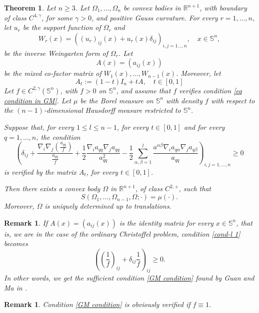 \documentclass[12pt]{amsart}
\newtheorem{thm}{Theorem}[section]
\newtheorem{remark}[theorem]{Remark}
\newcommand{\R}{\mathbb R}
\newcommand{\1}{\mathbf 1}
\newcommand{\s}{\mathbb S}
\newcommand{\sfe}{{{\mathbb S}^{n}}}
\begin{document}
\begin{thm}\label{Thm MCP} Let $n\ge3$. Let $\Omega_1,\dots,\Omega_n$ be convex bodies in $\R^{n+1}$, with boundary of class $C^{4,\gamma}$, for some $\gamma>0$, and positive Gauss curvature. For every $r=1,\dots,n$, let $u_r$ be the support function of $\Omega_r$ and 
$$
W_r(x)=((u_r)_{ij}(x)+u_r(x)\delta_{ij})_{i,j=1\dots,n},\quad x\in\sfe,
$$
be the inverse Weingarten form of $\Omega_r$. Let 
$$
A(x)=(a_{ij}(x))
$$
be the mixed co-factor matrix of $W_1(x),\dots,W_{n-1}(x)$. Moreover, let
$$
A_t:=(1-t)I_{n}+tA,\quad t\in[0,1]
$$
Let $f\in C^{2, \gamma}(\s^n)$, with $f>0$ on $\s^n$, and assume that $f$ verifies condition \eqref{eq condition in GM}. Let $\mu$ be the Borel measure on $\sfe$ with density $f$ with respect to the $(n-1)$-dimensional Hausdorff measure restricted to $\sfe$. 

Suppose that, for every $1\le l\le n-1$, for every $t\in[0,1]$ and for every $q=1,\ldots,n$, the condition
\begin{equation}\label{cond-l 1} 
\left(\delta_{ij}+ \frac{\nabla_i \nabla_j (\frac{a_{qq}}{f})}{\frac{a_{qq}}{f}}+\frac12\frac{\nabla_ia_{qq}\nabla_ja_{qq}}{a^2_{qq}}-\frac12\sum_{\alpha,\beta=1}^l \frac{a^{\alpha\beta}\nabla_ia_{q\alpha}\nabla_ja_{q\beta}}{a_{qq}}\right)_{i,j=1,\dots,n}\ge 0
\end{equation}
is verified by the matrix $A_t$, for every $t\in[0,1]$.

Then there exists a convex body $\Omega$ in $\R^{n+1}$, of class $C^{2,+}$, such that
$$
S(\Omega_1,\dots,\Omega_{n-1},\Omega;\cdot)=\mu(\cdot).
$$
Moreover, $\Omega$ is uniquely determined up to translations.
\end{thm}

\begin{remark}\label{remark} If $A(x)=(a_{ij}(x))$ is the identity matrix for every $x\in\sfe$, that is, we are in the case of the ordinary Christoffel problem, condition \eqref{cond-l 1} becomes
$$
\left(\left(\frac1{f}\right)_{ij}+\delta_{ij}\frac{1}{f}\right)_{ij}\ge0.
$$
In other words, we get the sufficient condition \eqref{GM condition} found by Guan and Ma in \cite{Guan-Ma-2003}. 
\end{remark}

\begin{remark} Condition \eqref{GM condition} is obviously verified if $f\equiv 1$.
\end{remark}
\end{document}
